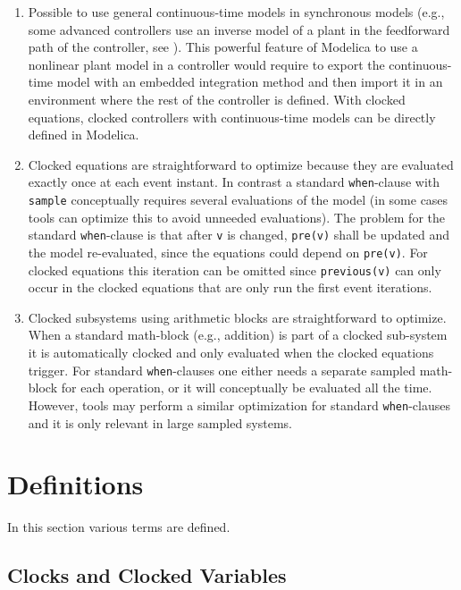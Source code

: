 \begin{nonnormative}
\begin{enumerate}
\item
  Possible to use general continuous-time models in synchronous models (e.g., some advanced controllers use an inverse model of a plant in the feedforward path of the controller, see \textcite{ThummelEtAl2005InverseModels}).
  This powerful feature of Modelica to use a nonlinear plant model in a controller would require to export the continuous-time model with an embedded integration method and then import it in an environment where the rest of the controller is defined.
  With clocked equations, clocked controllers with continuous-time models can be directly defined in Modelica.
\item
  Clocked equations are straightforward to optimize because they are evaluated exactly once at each event instant.
  In contrast a standard \lstinline!when!-clause with \lstinline!sample! conceptually requires several evaluations of the model (in some cases tools can optimize this to avoid unneeded evaluations).
  The problem for the standard \lstinline!when!-clause is that after \lstinline!v! is changed, \lstinline!pre(v)! shall be updated and the model re-evaluated, since the equations could depend on \lstinline!pre(v)!.
  For clocked equations this iteration can be omitted since \lstinline!previous(v)! can only occur in the clocked equations that are only run the first event iterations.
\item
  Clocked subsystems using arithmetic blocks are straightforward to optimize.
  When a standard math-block (e.g., addition) is part of a clocked sub-system it is automatically clocked and only evaluated when the clocked equations trigger.
  For standard \lstinline!when!-clauses one either needs a separate sampled math-block for each operation, or it will conceptually be evaluated all the time.
  However, tools may perform a similar optimization for standard \lstinline!when!-clauses and it is only relevant in large sampled systems.
\end{enumerate}
\end{nonnormative}

\section{Definitions}\label{definitions}

In this section various terms are defined.

\subsection{Clocks and Clocked Variables}\label{clocks-and-clocked-variables}

